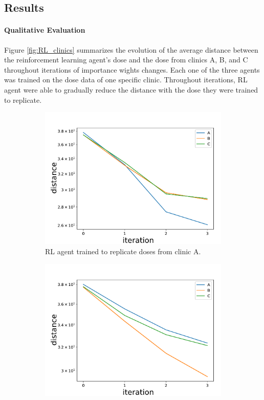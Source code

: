 \subsection{Results}
\paragraph{Qualitative Evaluation}
Figure \ref{fig:RL_clinics} summarizes the evolution of the average distance between the reinforcement learning agent’s dose and the dose from clinics A, B, and C throughout iterations of importance wights changes.
Each one of the three agents was trained on the dose data of one specific clinic.
Throughout iterations, RL agent were able to gradually reduce the distance with the dose they were trained to replicate.
\begin{figure}
	\centering
	\begin{subfigure}{0.32\linewidth}
		\centering
		\includegraphics[width=\linewidth]{ASTRO/distanceA_semilogy.pdf}
		\caption{RL agent trained to replicate doses from clinic A.}
		\label{fig:RL_clinic_A}
	\end{subfigure}
	\hfill
	\begin{subfigure}{0.32\linewidth}
		\centering
		\includegraphics[width=\linewidth]{ASTRO/distanceB_semilogy.pdf}

\end{subfigure}
\end{figure}
